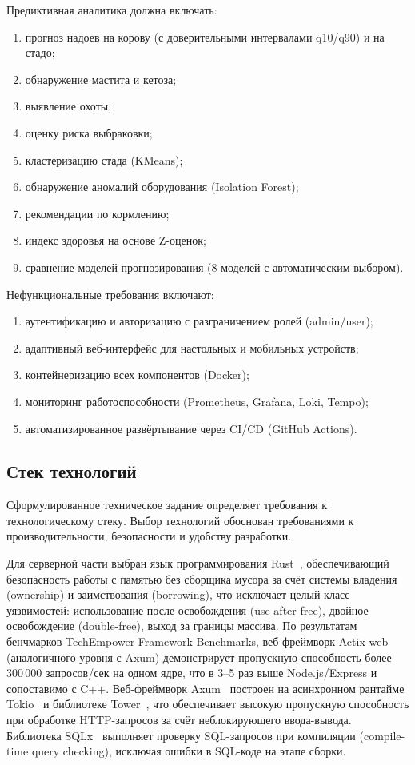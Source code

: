 Предиктивная аналитика должна включать:
\begin{enumerate}
    \item прогноз надоев на корову (с доверительными интервалами q10/q90) и на стадо;
    \item обнаружение мастита и кетоза;
    \item выявление охоты;
    \item оценку риска выбраковки;
    \item кластеризацию стада (KMeans);
    \item обнаружение аномалий оборудования (Isolation Forest);
    \item рекомендации по кормлению;
    \item индекс здоровья на основе Z-оценок;
    \item сравнение моделей прогнозирования (8 моделей с автоматическим выбором).
\end{enumerate}

Нефункциональные требования включают:
\begin{enumerate}
    \item аутентификацию и авторизацию с разграничением ролей (admin/user);
    \item адаптивный веб-интерфейс для настольных и мобильных устройств;
    \item контейнеризацию всех компонентов (Docker);
    \item мониторинг работоспособности (Prometheus, Grafana, Loki, Tempo);
    \item автоматизированное развёртывание через CI/CD (GitHub Actions).
\end{enumerate}

\subsection{Стек технологий}

Сформулированное техническое задание определяет требования к технологическому стеку. Выбор технологий обоснован требованиями к производительности, безопасности и удобству разработки.

Для серверной части выбран язык программирования Rust~\cite{RustLang}, обеспечивающий безопасность работы с памятью без сборщика мусора за счёт системы владения (ownership) и заимствования (borrowing), что исключает целый класс уязвимостей: использование после освобождения (use-after-free), двойное освобождение (double-free), выход за границы массива. По результатам бенчмарков TechEmpower Framework Benchmarks, веб-фреймворк Actix-web (аналогичного уровня с Axum) демонстрирует пропускную способность более 300\,000 запросов/сек на одном ядре, что в 3--5 раз выше Node.js/Express и сопоставимо с C++. Веб-фреймворк Axum~\cite{Axum} построен на асинхронном рантайме Tokio~\cite{Tokio} и библиотеке Tower~\cite{Tower}, что обеспечивает высокую пропускную способность при обработке HTTP-запросов за счёт неблокирующего ввода-вывода. Библиотека SQLx~\cite{SQLx} выполняет проверку SQL-запросов при компиляции (compile-time query checking), исключая ошибки в SQL-коде на этапе сборки.

